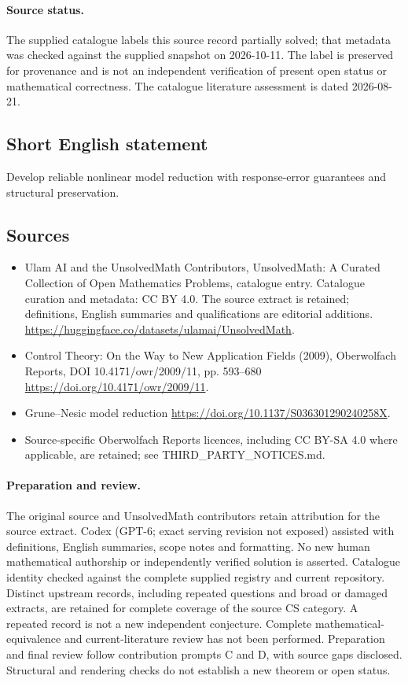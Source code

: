 \documentclass[11pt]{article}
\begin{document}
\paragraph{Source status.}
The supplied catalogue labels this source record partially solved; that metadata was checked against the supplied snapshot on 2026-10-11. The label is preserved for provenance and is not an independent verification of present open status or mathematical correctness. The catalogue literature assessment is dated 2026-08-21.
\subsection{Short English statement}
Develop reliable nonlinear model reduction with response-error guarantees and structural preservation.
\subsection{Sources}
\begin{itemize}
\item[S1] Ulam AI and the UnsolvedMath Contributors, UnsolvedMath: A Curated Collection of Open Mathematics Problems, catalogue entry. Catalogue curation and metadata: CC BY 4.0. The source extract is retained; definitions, English summaries and qualifications are editorial additions.
\url{https://huggingface.co/datasets/ulamai/UnsolvedMath}.
\item[S2] Control Theory: On the Way to New Application Fields (2009), Oberwolfach Reports, DOI 10.4171/owr/2009/11, pp. 593--680
\url{https://doi.org/10.4171/owr/2009/11}.
\item[S3] Grune--Nesic model reduction
\url{https://doi.org/10.1137/S036301290240258X}.
\item Source-specific Oberwolfach Reports licences, including CC BY-SA 4.0 where applicable, are retained; see THIRD\_PARTY\_NOTICES.md.
\end{itemize}
\paragraph{Preparation and review.}
The original source and UnsolvedMath contributors retain attribution for the source extract. Codex (GPT-6; exact serving revision not exposed) assisted with definitions, English summaries, scope notes and formatting. No new human mathematical authorship or independently verified solution is asserted. Catalogue identity checked against the complete supplied registry and current repository. Distinct upstream records, including repeated questions and broad or damaged extracts, are retained for complete coverage of the source CS category. A repeated record is not a new independent conjecture. Complete mathematical-equivalence and current-literature review has not been performed. Preparation and final review follow contribution prompts C and D, with source gaps disclosed. Structural and rendering checks do not establish a new theorem or open status.
\label{end:statement}
\end{document}
